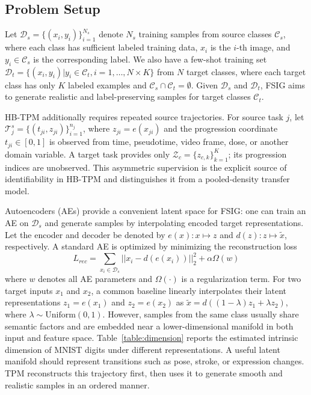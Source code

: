 \documentclass{article}
\def\V#1{\boldsymbol{\mathit#1}}          %
\def\Cal#1{\mathcal#1}
\begin{document}
\subsection{Problem Setup}
Let $\Cal{D}_s = \{ (\V{x}_i, y_i)\}_{i=1}^{N_s}$ denote $N_s$ training samples from source classes $\Cal{C}_s$, where each class has sufficient labeled training data, $\V{x}_i$ is the $i$-th image, and $y_i \in \Cal{C}_s$ is the corresponding label. We also have a few-shot training set $\Cal{D}_t = \{(\V{x}_i, y_i) | y_i \in \Cal{C}_t, i=1,\ldots, N\times K\}$ from $N$ target classes, where each target class has only $K$ labeled examples and $\Cal{C}_s \cap \Cal{C}_t = \emptyset$. Given $\Cal{D}_s$ and $\Cal{D}_t$, FSIG aims to generate realistic and label-preserving samples for target classes $\Cal{C}_t$. 

HB-TPM additionally requires repeated source trajectories. For source task $j$, let $\Cal{T}_j^s=\{(t_{ji},z_{ji})\}_{i=1}^{n_j}$, where $z_{ji}=e(x_{ji})$ and the progression coordinate $t_{ji}\in[0,1]$ is observed from time, pseudotime, video frame, dose, or another domain variable. A target task provides only $\Cal{Z}_c=\{z_{c,k}\}_{k=1}^{K}$; its progression indices are unobserved. This asymmetric supervision is the explicit source of identifiability in HB-TPM and distinguishes it from a pooled-density transfer model.

Autoencoders (AEs) provide a convenient latent space for FSIG: one can train an AE on $\Cal{D}_s$ and generate samples by interpolating encoded target representations. Let the encoder and decoder be denoted by $e(\V{x}): \V{x} \mapsto \V{z}$ and $d(\V{z}):\V{z} \mapsto \tilde{\V{x}}$, respectively. A standard AE is optimized by minimizing the reconstruction loss
\begin{equation}
	L_{rec} = \sum_{\V{x}_i \in \Cal{D}_s} || \V{x}_i - d(e(\V{x}_i))||_2^2 + \alpha \Omega(\V{w}) 
\end{equation}
where $\V{w}$ denotes all AE parameters and $\Omega(\cdot)$ is a regularization term. For two target inputs $\V{x}_1$ and $\V{x}_2$, a common baseline linearly interpolates their latent representations $\V{z}_1=e(\V{x}_1)$ and $\V{z}_2=e(\V{x}_2)$ as $\tilde{\V{x}} = d((1-\lambda)\V{z}_1+\lambda\V{z}_2)$, where $\lambda\sim \mathrm{Uniform}(0,1)$. However, samples from the same class usually share semantic factors and are embedded near a lower-dimensional manifold in both input and feature space. Table~\ref{table:dimension} reports the estimated intrinsic dimension of MNIST digits under different representations. A useful latent manifold should represent transitions such as pose, stroke, or expression changes. TPM reconstructs this trajectory first, then uses it to generate smooth and realistic samples in an ordered manner.
\end{document}
